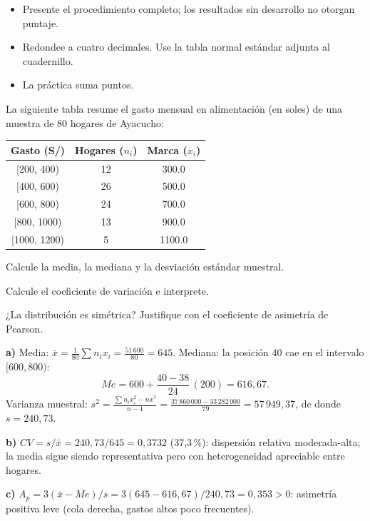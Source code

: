 \documentclass{academic-exam}
\begin{document}
\membrete

\begin{instrucciones}
\begin{itemize}
  \item Presente el procedimiento completo; los resultados sin desarrollo
        no otorgan puntaje.
  \item Redondee a cuatro decimales. Use la tabla normal estándar adjunta
        al cuadernillo.
  \item La práctica suma \totalpuntos{} puntos.
\end{itemize}
\end{instrucciones}


\begin{ejercicio}
La siguiente tabla resume el gasto mensual en alimentación (en soles) de
una muestra de 80 hogares de Ayacucho:

\begin{center}
\small
\begin{tabular}{@{}c S[table-format=2.0] S[table-format=3.1]@{}}
  \toprule
  \textbf{Gasto (S/)} & {\textbf{Hogares} ($n_i$)} & {\textbf{Marca} ($x_i$)}\\
  \midrule
  {}[200, 400)  & 12 & 300.0\\
  {}[400, 600)  & 26 & 500.0\\
  {}[600, 800)  & 24 & 700.0\\
  {}[800, 1000) & 13 & 900.0\\
  {}[1000, 1200)&  5 & 1100.0\\
  \bottomrule
\end{tabular}
\end{center}

\begin{apartados}
  \item Calcule la media, la mediana y la desviación estándar muestral. 
  \item Calcule el coeficiente de variación e interprete. 
  \item ¿La distribución es simétrica? Justifique con el coeficiente de
        asimetría de Pearson. 
\end{apartados}
\espaciorespuesta{7cm}
\begin{solucion}
\textbf{a)} Media: $\bar{x} = \frac{1}{80}\sum n_i x_i =
\frac{51\,600}{80} = 645$. Mediana: la posición 40 cae en el intervalo
$[600,800)$:
\[
  Me = 600 + \frac{40-38}{24}\,(200) = 616{,}67.
\]
Varianza muestral: $s^{2} = \frac{\sum n_i x_i^{2} - n\bar{x}^{2}}{n-1}
= \frac{37\,860\,000 - 33\,282\,000}{79} = 57\,949{,}37$, de donde
$s = 240{,}73$.

\textbf{b)} $CV = s/\bar{x} = 240{,}73/645 = 0{,}3732$ (37,3\,\%):
dispersión relativa moderada-alta; la media sigue siendo representativa
pero con heterogeneidad apreciable entre hogares.

\textbf{c)} $A_p = 3(\bar{x}-Me)/s = 3(645-616{,}67)/240{,}73 = 0{,}353>0$:
asimetría positiva leve (cola derecha, gastos altos poco frecuentes).
\end{solucion}
\end{ejercicio}
\end{document}
